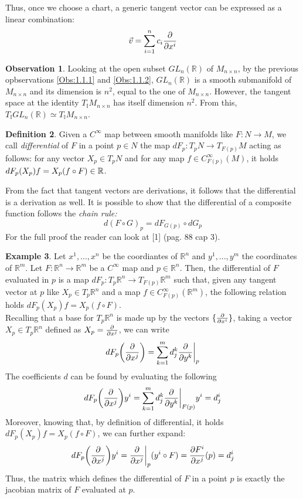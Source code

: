 \documentclass[12pt,a4paper]{report}
\theoremstyle{definition}
\newtheorem{Def}{Definition}[chapter]
\theoremstyle{Theorem}
\theoremstyle{definition}
\newtheorem{Ex}[Def]{Example}
\theoremstyle{definition}
\newtheorem{Obs}[Def]{Observation}
\begin{document}
		Thus, once we choose a chart, a generic tangent vector can be expressed as a linear combination: $$\vec{v}=\sum_{i=1}^{n}c_i{\partial\over \partial x^i}$$ 
		\begin{Obs} \label{Obs 1.1.3}
			Looking at the open subset $GL_n(\mathbb{R})$ of $M_{n\times n}$, by the previous opbservations \ref{Obs:1.1.1} and \ref{Obs:1.1.2}, $GL_n(\mathbb{R})$ is a smooth submanifold of $M_{n\times n}$ and its dimension is $n^2$, equal to the one of $M_{n\times n}$. However, the tangent space at the identity $T_\mathbb{I}M_{n\times n}$ has itself dimension $n^2$. From this, $T_\mathbb{I}GL_n(\mathbb{R})\simeq T_\mathbb{I}M_{n\times n}$.
		\end{Obs}
		\begin{Def}
			Given a $C^\infty$ map between smooth manifolds like $F:N\rightarrow M$, we call \textit{differential} of $F$ in a point $p\in N$ the map $dF_p:T_pN\rightarrow T_{F(p)}M$ acting as follows: for any vector $X_p\in T_pN$ and for any map $f\in C_{F(p)}^\infty(M)$, it holds $dF_p(X_p)f=\\X_p(f\circ F)\in\mathbb{R}$.
		\end{Def}
		From the fact that tangent vectors are derivations, it follows that the differential is a derivation as well. It is possible to show that the differential of a composite function follows the \textit{chain rule:} 
		$$d(F\circ G)_p=dF_{G(p)}\circ dG_p$$ 
		For the full proof the reader can look at [1] (pag. 88 cap 3).
		\begin{Ex}
			Let $x^1,...,x^n$ be the coordiantes of $\mathbb{R}^n$ and $y^1,...,y^m$ the coordinates of $\mathbb{R}^m$. Let $F:\mathbb{R}^n\rightarrow \mathbb{R}^m$ be a $C^\infty$ map and $p\in \mathbb{R}^n$. Then, the differential of $F$ evaluated in $p$ is a map $dF_p:T_p\mathbb{R}^n\rightarrow T_{F(p)}\mathbb{R}^m$ such that, given any tangent vector at $p$ like $X_p\in T_p\mathbb{R}^n$ and a map $f\in C_{F(p)}^\infty(\mathbb{R}^m)$, the following relation holds $dF_p(X_p)f=X_p(f\circ F)$.\\
			Recalling that a base for $T_p\mathbb{R}^n$ is made up by the vectors $\{{\partial\over\partial x^i}\}$, taking a vector $X_p\in T_p\mathbb{R}^n$ defined as $X_p={\partial\over \partial x^j}$, we can write $$dF_p\bigg{(}{\partial\over \partial x^j}\bigg{)}=\sum_{k=1}^{m}d_j^k{\partial\over \partial y^k}\bigg{\rvert}_p$$
			The coefficients $d$ can be found by evaluating the following 
			$$dF_p\bigg{(}{\partial\over \partial x^j}\bigg{)}y^i=\sum_{k=1}^{m}d_j^k{\partial\over \partial y^k}\bigg{\rvert}_{F(p)}y^i=d_j^i$$
			Moreover, knowing that, by definition of differential, it holds $dF_p(X_p)f=X_p(f\circ F)$, we can further expand:
			$$dF_p\bigg{(}{\partial\over \partial x^j}\bigg{)}y^i={\partial\over \partial x^j}\bigg{\rvert}_p(y^i\circ F)={\partial F^i\over \partial x^j}(p)=d^i_j$$
			Thus, the matrix which defines the differential of $F$ in a point $p$ is exactly the jacobian matrix of $F$ evaluated at $p$.
		\end{Ex}
\end{document}
